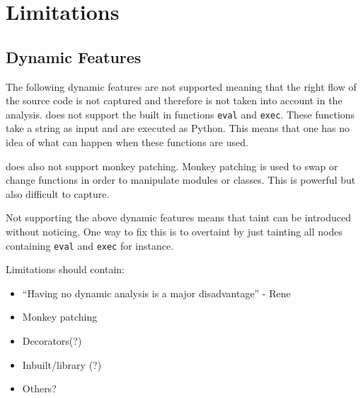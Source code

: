 \section{Limitations}
\subsection{Dynamic Features}
The following dynamic features are not supported meaning that the right flow of the source code is not captured and therefore is not taken into account in the analysis.
\pyt{} does not support the built in functions \texttt{eval} and \texttt{exec}.
These functions take a string as input and are executed as Python.
This means that one has no idea of what can happen when these functions are used.

\pyt{} does also not support monkey patching.
Monkey patching is used to swap or change functions in order to manipulate modules or classes.
This is powerful but also difficult to capture.

Not supporting the above dynamic features means that taint can be introduced without \pyt{} noticing.
One way to fix this is to overtaint by just tainting all nodes containing \texttt{eval} and \texttt{exec} for instance.

Limitations should contain:
\begin{itemize}
\item ``Having no dynamic analysis is a major disadvantage'' - Rene
\item Monkey patching
\item Decorators(?)
\item Inbuilt/library (?)
\item Others?
\end{itemize}

